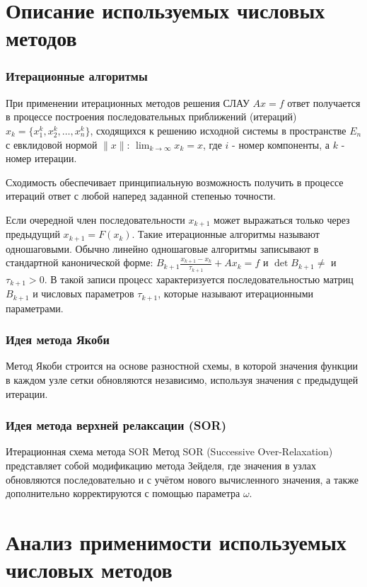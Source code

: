 \documentclass[a4paper, fleqn]{report}
\begin{document}
\chapter{Описание используемых числовых методов}

\subsection*{Итерационные алгоритмы}

При применении итерационных методов решения СЛАУ $Ax = f$ ответ получается в процессе построения последовательных приближений (итераций) $x_k = \{x_1^k, x_2^k, \dots, x_n^k\}$, сходящихся к решению исходной системы в пространстве $E_n$ с евклидовой нормой $\|x\|$: $\lim_{k \to \infty} x_k = x$, где $i$ - номер компоненты, а $k$ - номер итерации.

Сходимость обеспечивает принципиальную возможность получить в процессе итераций ответ с любой наперед заданной степенью точности. 

Если очередной член последовательности $x_{k+1}$ может выражаться только через предыдущий $x_{k+1} = F(x_k) $. Такие итерационные алгоритмы называют одношаговыми. Обычно линейно одношаговые алгоритмы записывают в стандартной канонической форме:
$B_{k+1} \frac{x_{k+1} - x_k}{\tau_{k+1}} + Ax_k = f$ и $\det B_{k+1} \neq$ и $\tau_{k+1} > 0$. В такой записи процесс характеризуется последовательностью матриц $B_{k+1}$ и числовых параметров $\tau_{k+1}$, которые называют итерационными параметрами.

\subsection*{Идея метода Якоби}
Метод Якоби строится на основе разностной схемы, в которой значения функции в каждом узле сетки обновляются независимо, используя значения с предыдущей итерации.

\subsection*{Идея метода верхней релаксации (SOR)}
Итерационная схема метода SOR
Метод SOR (Successive Over-Relaxation) представляет собой модификацию метода Зейделя, где значения в узлах обновляются последовательно и с учётом нового вычисленного значения, а также дополнительно корректируются с помощью параметра \(\omega\).

\chapter{Анализ применимости используемых числовых методов}
\end{document}
